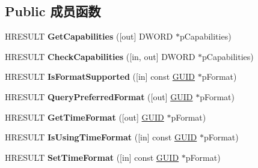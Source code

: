 \subsection*{Public 成员函数}
\begin{DoxyCompactItemize}
\item 
\mbox{\label{interface_i_media_seeking_a5d6fdb82ba7e42aff1e817caf436c757}} 
H\+R\+E\+S\+U\+LT {\bfseries Get\+Capabilities} (\mbox{[}out\mbox{]} D\+W\+O\+RD $\ast$p\+Capabilities)
\item 
\mbox{\label{interface_i_media_seeking_a69e00c624d329e3b522013dbdd101c49}} 
H\+R\+E\+S\+U\+LT {\bfseries Check\+Capabilities} (\mbox{[}in, out\mbox{]} D\+W\+O\+RD $\ast$p\+Capabilities)
\item 
\mbox{\label{interface_i_media_seeking_ab4d572411d03e66685ff44eb592c0a73}} 
H\+R\+E\+S\+U\+LT {\bfseries Is\+Format\+Supported} (\mbox{[}in\mbox{]} const \hyperlink{interface_g_u_i_d}{G\+U\+ID} $\ast$p\+Format)
\item 
\mbox{\label{interface_i_media_seeking_a5a27679cce9195d25fc3d33986d55da4}} 
H\+R\+E\+S\+U\+LT {\bfseries Query\+Preferred\+Format} (\mbox{[}out\mbox{]} \hyperlink{interface_g_u_i_d}{G\+U\+ID} $\ast$p\+Format)
\item 
\mbox{\label{interface_i_media_seeking_af2f1801d38edef41cbea367b7407a24a}} 
H\+R\+E\+S\+U\+LT {\bfseries Get\+Time\+Format} (\mbox{[}out\mbox{]} \hyperlink{interface_g_u_i_d}{G\+U\+ID} $\ast$p\+Format)
\item 
\mbox{\label{interface_i_media_seeking_a760ef14c31a30ca08545cfa98c8101f8}} 
H\+R\+E\+S\+U\+LT {\bfseries Is\+Using\+Time\+Format} (\mbox{[}in\mbox{]} const \hyperlink{interface_g_u_i_d}{G\+U\+ID} $\ast$p\+Format)
\item 
\mbox{\label{interface_i_media_seeking_af748110c38bc24f311bd28b8502d4c65}} 
H\+R\+E\+S\+U\+LT {\bfseries Set\+Time\+Format} (\mbox{[}in\mbox{]} const \hyperlink{interface_g_u_i_d}{G\+U\+ID} $\ast$p\+Format)
\item 
\mbox{\label{interface_i_media_seeking_a0ac4eacf59757a1690063fbecb44c323}} 

\end{DoxyCompactItemize}

